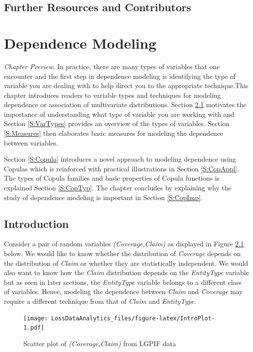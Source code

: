 \documentclass[]{book}
\theoremstyle{definition}
\theoremstyle{definition}
\theoremstyle{definition}
\theoremstyle{remark}
\begin{document}
\section{Further Resources and
Contributors}\label{further-resources-and-contributors}

\chapter{Dependence Modeling}\label{dependence-modeling}

\emph{Chapter Preview}. In practice, there are many types of variables
that one encounter and the first step in dependence modeling is
identifying the type of variable you are dealing with to help direct you
to the appropriate technique.This chapter introduces readers to variable
types and techniques for modeling dependence or association of
multivariate distributions. Section \ref{S:Intro} motivates the
importance of understanding what type of variable you are working with
and Section \ref{S:VarTypes} provides an overview of the types of
variables. Section \ref{S:Measures} then elaborates basic measures for
modeling the dependence between variables.

Section \ref{S:Copula} introduces a novel approach to modeling
dependence using Copulas which is reinforced with practical
illustrations in Section \ref{S:CopAppl}. The types of Copula families
and basic properties of Copula functions is explained Section
\ref{S:CopTyp}. The chapter concludes by explaining why the study of
dependence modeling is important in Section \ref{S:CopImp}.

\section{Introduction}\label{S:Intro}

Consider a pair of random variables \emph{(Coverage,Claim)} as displayed
in Figure \ref{fig:IntroPlot} below. We would like to know whether the
distribution of \emph{Coverage} depends on the distribution of
\emph{Claim} or whether they are statistically independent. We would
also want to know how the \emph{Claim} distribution depends on the
\emph{EntityType} variable but as seen in later sections, the
\emph{EntityType} variable belongs to a different class of variables.
Hence, modeling the dependence between \emph{Claim} and \emph{Coverage}
may require a different technique from that of \emph{Claim} and
\emph{EntityType}.

\begin{figure}
\centering
\texttt{[image: LossDataAnalytics\_files/figure-latex/IntroPlot-1.pdf]}
\caption{\label{fig:IntroPlot}Scatter plot of \emph{(Coverage,Claim)} from
LGPIF data}
\end{figure}
\end{document}

